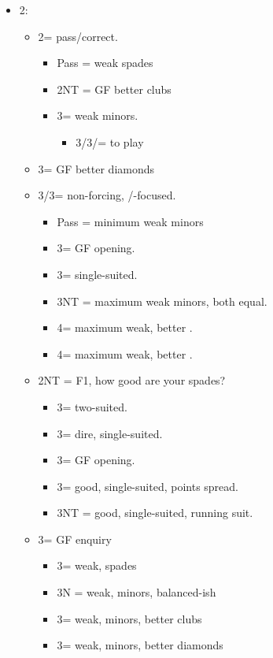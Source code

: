\documentclass[a4paper,14pt]{extarticle}
\begin{document}
\begin{itemize}
\newpage

\item 2\hearts:
	\begin{itemize}
   \item 2\spades = pass/correct.
		\begin{itemize}
	   \item Pass = weak spades
      \item 2NT = GF better clubs
      \item 3\clubs = weak minors.
			\begin{itemize}
			\item 3\diamonds/3\hearts/\spades = to play
			\end{itemize}
		\end{itemize}
      \item 3\diamonds = GF better diamonds
   \item 3\clubs/3\diamonds = non-forcing, \clubs/\diamonds-focused.
		\begin{itemize}
		\item Pass = minimum weak minors
      \item 3\hearts = GF opening.
      \item 3\spades = single-suited.
      \item 3NT = maximum weak minors, both equal.
      \item 4\clubs = maximum weak, better \clubs.
      \item 4\diamonds = maximum weak, better \diamonds.
		\end{itemize}
   \item 2NT = F1, how good are your spades?
		\begin{itemize}
      \item 3\clubs = two-suited.
      \item 3\diamonds = dire, single-suited.
      \item 3\hearts = GF opening.
      \item 3\spades = good, single-suited, points spread.
      \item 3NT = good, single-suited, running suit.
		\end{itemize}
	\item 3\hearts = GF enquiry
		\begin{itemize}
		\item 3\spades = weak, spades
		\item 3N = weak, minors, balanced-ish
		\item 3\clubs = weak, minors, better clubs
		\item 3\diamonds = weak, minors, better diamonds
		\end{itemize}
	\end{itemize}


\end{itemize}
\end{document}
